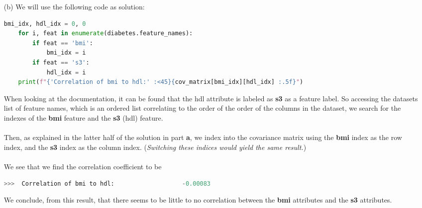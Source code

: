 \documentclass[12pt, letterpaper]{article}
\begin{document}
\begin{enumerate}
\newpage
    \item [(b)] We will use the following code as solution:
\begin{lstlisting}[language=python]
    bmi_idx, hdl_idx = 0, 0
    for i, feat in enumerate(diabetes.feature_names):
        if feat == 'bmi':
            bmi_idx = i
        if feat == 's3':
            hdl_idx = i
    print(f"{'Correlation of bmi to hdl:' :<45}{cov_matrix[bmi_idx][hdl_idx] :.5f}")
\end{lstlisting}
    When looking at the documentation, it can be found that the hdl attribute is labeled as {\bf s3} as a 
    feature label. So accessing the datasets list of feature names, which is an ordered list correlating to 
    the order of the order of the columns in the dataset, we search for the indexes of the {\bf bmi} feature 
    and the {\bf s3} (hdl) feature. \\ \\
    Then, as explained in the latter half of the solution in part {\bf a}, we index into the covariance matrix 
    using the {\bf bmi} index as the row index, and the {\bf s3} index as the column index. ({\it Switching these indices 
    would yield the same result.}) \\ \\
    We see that we find the correlation coefficient to be 
\begin{lstlisting}[language=python]
    >>>  Correlation of bmi to hdl:                   -0.00083
\end{lstlisting}
    We conclude, from this result, that there seems to be little to no correlation between the {\bf bmi} attributes
    and the {\bf s3} attributes.


\end{enumerate}
\end{document}

